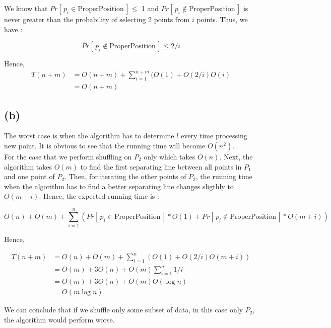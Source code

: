 We know that $Pr[\,p_i \in \text{ProperPosition}\,] \le$ 1 and $Pr[\,p_i \not\in \text{ProperPosition}\,]$
is never greater than the probability of selecting 2 points from $i$ points. Thus,
we have :

$$
Pr[\,p_i \not\in \text{ProperPosition}\,] \le 2/i
$$

Hence,
\begin{align*}
T(n+m) &= O(n+m) + \sum_{i=1}^{n+m}( O(1) + O(2/i)O(i) \\
&= O(n+m)
\end{align*}


\subsection*{(b)}
The worst case is when the algorithm has to determine $l$ every time processing
new point. It is obvious to see that the running time will become $O(n^2)$. \\

For the case that we perform shuffling on $P_2$ only which takes $O(n)$. Next,
the algorithm takes $O(m)$ to find the first separating line between all points in $P_1$
and one point of $P_2$. Then, for iterating the other points of $P_2$, the running
time when the algorithm has to find a better separating line changes sligthly to
$O(m+i)$. Hence, the expected running time is :

$$
O(n) + O(m) + \sum_{i=1}^{n}{ ( Pr[\,p_i \in \text{ProperPosition}\,]*O(1)
    + Pr[\,p_i \not\in \text{ProperPosition}\,]*O(m+i)
) }
$$

Hence,

\begin{align*}
T(n+m) &= O(n) + O(m) + \sum_{i=1}^{n}(O(1) + O(2/i)O(m+i)) \\
&= O(m) + 3O(n) + O(m)\sum_{i=1}^{n}1/i \\
&= O(m) + 3O(n) + O(m)O(\log{n}) \\
&= O(m\log{n})
\end{align*}

We can conclude that if we shuffle only some subset of data, in this case only $P_2$,
the algorithm would perform worse.
